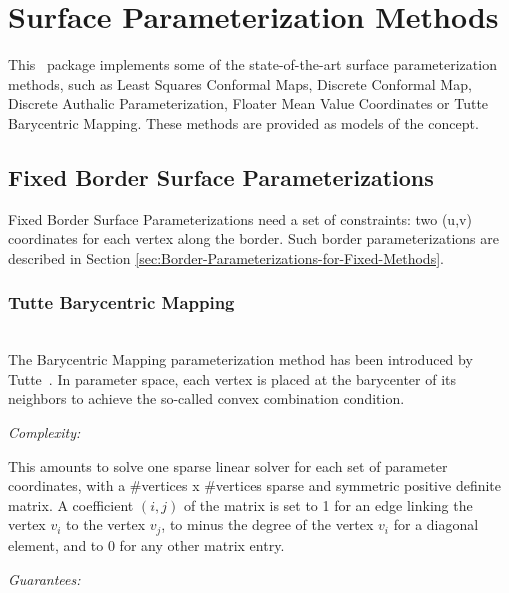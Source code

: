 \section{Surface Parameterization Methods}
\label{sec:Surface-Parameterization-Methods}

This \cgal\ package implements some of the state-of-the-art
surface parameterization methods, such as Least Squares Conformal Maps,
Discrete Conformal Map, Discrete Authalic
Parameterization, Floater Mean Value Coordinates or Tutte Barycentric
Mapping. These methods are provided as models of the
 concept.


\subsection{Fixed Border Surface Parameterizations}


Fixed Border Surface Parameterizations need a set of constraints: two
(u,v) coordinates for each vertex along the border.
Such border parameterizations are described in Section
\ref{sec:Border-Parameterizations-for-Fixed-Methods}.

\subsubsection{Tutte Barycentric Mapping}

  \\

The Barycentric Mapping parameterization method has been introduced by
Tutte~\cite{t-hdg-63}. In parameter space, each vertex is
placed at the barycenter of its neighbors to achieve the so-called
convex combination condition.

\emph{Complexity:}

This amounts to solve one
sparse linear solver for each set of parameter coordinates, with a
\#vertices x \#vertices sparse and symmetric positive definite matrix.
A coefficient $(i, j)$ of the matrix is set to 1 for an edge linking
the vertex $v_i$ to the vertex $v_j$, to minus the degree of the
vertex $v_i$ for a diagonal element, and to 0 for any other matrix
entry.

\emph{Guarantees:}

